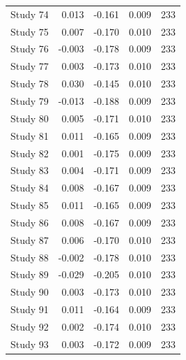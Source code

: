 \begin{table}[!h]
{\begin{tabular}[t]{rrrrr}
\hspace{1em}Study 74 & 0.013 & -0.161 & 0.009 & 233\\
\hspace{1em}Study 75 & 0.007 & -0.170 & 0.010 & 233\\
\hspace{1em}Study 76 & -0.003 & -0.178 & 0.009 & 233\\
\hspace{1em}Study 77 & 0.003 & -0.173 & 0.010 & 233\\
\hspace{1em}Study 78 & 0.030 & -0.145 & 0.010 & 233\\
\hspace{1em}Study 79 & -0.013 & -0.188 & 0.009 & 233\\
\hspace{1em}Study 80 & 0.005 & -0.171 & 0.010 & 233\\
\hspace{1em}Study 81 & 0.011 & -0.165 & 0.009 & 233\\
\hspace{1em}Study 82 & 0.001 & -0.175 & 0.009 & 233\\
\hspace{1em}Study 83 & 0.004 & -0.171 & 0.009 & 233\\
\hspace{1em}Study 84 & 0.008 & -0.167 & 0.009 & 233\\
\hspace{1em}Study 85 & 0.011 & -0.165 & 0.009 & 233\\
\hspace{1em}Study 86 & 0.008 & -0.167 & 0.009 & 233\\
\hspace{1em}Study 87 & 0.006 & -0.170 & 0.010 & 233\\
\hspace{1em}Study 88 & -0.002 & -0.178 & 0.010 & 233\\
\hspace{1em}Study 89 & -0.029 & -0.205 & 0.010 & 233\\
\hspace{1em}Study 90 & 0.003 & -0.173 & 0.010 & 233\\
\hspace{1em}Study 91 & 0.011 & -0.164 & 0.009 & 233\\
\hspace{1em}Study 92 & 0.002 & -0.174 & 0.010 & 233\\
\hspace{1em}Study 93 & 0.003 & -0.172 & 0.009 & 233\\

\end{tabular}}
\end{table}
